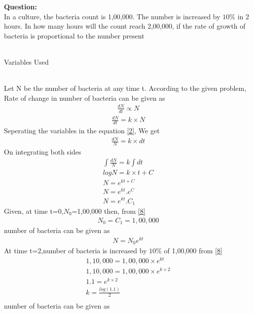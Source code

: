\documentclass[journal]{IEEEtran}
\begin{document}
\textbf{Question:} \\
In a culture, the bacteria count is 1,00,000. The number is increased by $10\%$ in 2 hours. In how many hours will the count reach 2,00,000, if the rate of growth of bacteria is proportional to the number present\\ \\
\solution 
\begin{table}[h!]
    \centering
    
    \caption{Variables Used}
    
\end{table}
\\
\solution Let N be the number of bacteria at any time t. According to the given problem, Rate of change in number of bacteria can be given as 
\begin{align}
\frac{dN}{dt} \propto N \label{1}
\end{align}
\begin{align}
\frac{dN}{dt} = k \times N \label{2}
\end{align}
Seperating the variables in the equation \eqref{2}, We get 
\begin{align}
\frac{dN}{N}=k \times dt \label{3}
\end{align}
On integrating both sides
\begin{align}
\int \frac{dN}{N}=k\int dt  \label{4} \\
log N = k \times t+C \label{5} \\
N=e^{kt+C} \label{6} \\
N=e^{kt} . e^{C} \label{7} \\
N=e^{kt} . C_1 \label{8}
\end{align}
Given, at time t=0,$N_0$=1,00,000 then, from \eqref{8}
\begin{align}
N_0=C_1=1,00,000 \label{9}
\end{align}
number of bacteria can be given as 
\begin{align}
N = N_0 e^{kt} \label{10}
\end{align}
At time t=2,number of bacteria is increased by $10\%$ of 1,00,000 from \eqref{8} \\
\begin{align}
1,10,000 =1,00,000\times e^{kt} \\
1,10,000 =1,00,000 \times e^{k\times 2} \\
1.1 = e^{k\times 2} \\
k = \frac{log (1.1)}{2} \\
\end{align}
number of bacteria can be given as 
\end{document}
